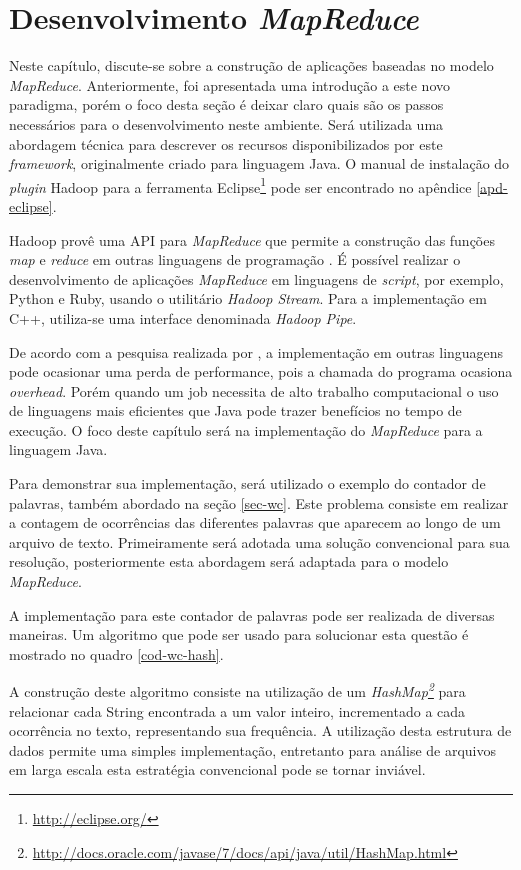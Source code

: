 \chapter{Desenvolvimento \textit{MapReduce}}
\label{cap:mapreduce-devel}

Neste capítulo, discute-se sobre a construção de aplicações baseadas no modelo \textit{MapReduce}. Anteriormente, foi apresentada uma introdução a este novo paradigma, porém o foco desta seção é deixar claro quais são os passos necessários para o desenvolvimento neste ambiente. Será utilizada uma abordagem técnica para descrever os recursos disponibilizados por este \textit{framework}, originalmente criado para linguagem Java. O manual de instalação do \textit{plugin} Hadoop para a ferramenta Eclipse\footnote{\url{http://eclipse.org/}} pode ser encontrado no apêndice \ref{apd-eclipse}.

Hadoop provê uma API para \textit{MapReduce} que permite a construção das funções \textit{map} e \textit{reduce} em outras linguagens de programação \cite{white2012}. É possível realizar o desenvolvimento de aplicações \textit{MapReduce} em linguagens de \textit{script}, por exemplo, Python e Ruby, usando o utilitário \textit{Hadoop Stream}. Para a implementação em C++, utiliza-se uma interface denominada \textit{Hadoop Pipe}.

De acordo com a pesquisa realizada por , a implementação em outras linguagens pode ocasionar uma perda de performance, pois a chamada do programa ocasiona \textit{overhead}. Porém quando um job necessita de alto trabalho computacional o uso de linguagens mais eficientes que Java pode trazer benefícios no tempo de execução. O foco deste capítulo será na implementação do \textit{MapReduce} para a linguagem Java.

Para demonstrar sua implementação, será utilizado o exemplo do contador de palavras, também abordado na seção \ref{sec-wc}. Este problema consiste em realizar a contagem de ocorrências das diferentes palavras que aparecem ao longo de um arquivo de texto. Primeiramente será adotada uma solução convencional para sua resolução, posteriormente esta abordagem será adaptada para o modelo \textit{MapReduce}.

A implementação para este contador de palavras pode ser realizada de diversas maneiras. Um algoritmo que pode ser usado para solucionar esta questão é mostrado no quadro \ref{cod-wc-hash}.

A construção deste algoritmo consiste na utilização de um \textit{HashMap\footnote{\url{http://docs.oracle.com/javase/7/docs/api/java/util/HashMap.html}}} para relacionar cada String encontrada a um valor inteiro, incrementado a cada ocorrência no texto, representando sua frequência. A utilização desta estrutura de dados permite uma simples implementação, entretanto para análise de arquivos em larga escala esta estratégia convencional pode se tornar inviável.

